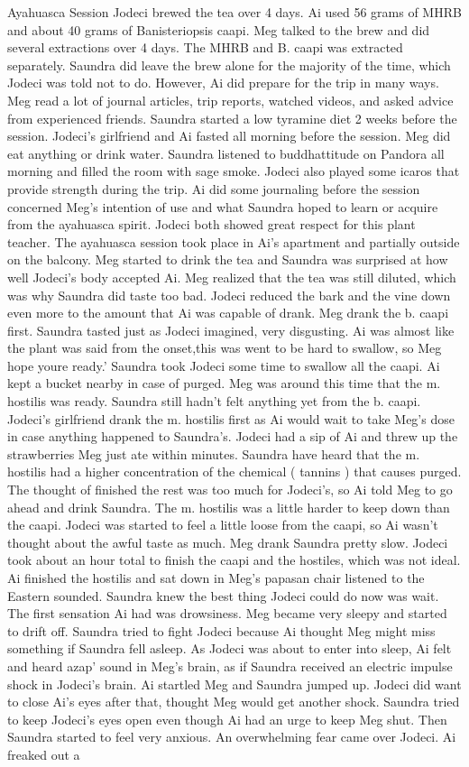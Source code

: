 \documentclass[12pt]{book}
\begin{document}
Ayahuasca Session Jodeci brewed the tea over 4 days. Ai used 56 grams of MHRB and about 40 grams of Banisteriopsis caapi. Meg talked to the brew and did several extractions over 4 days. The MHRB and B. caapi was extracted separately. Saundra did leave the brew alone for the majority of the time, which Jodeci was told not to do. However, Ai did prepare for the trip in many ways. Meg read a lot of journal articles, trip reports, watched videos, and asked advice from experienced friends. Saundra started a low tyramine diet 2 weeks before the session. Jodeci's girlfriend and Ai fasted all morning before the session. Meg did eat anything or drink water. Saundra listened to buddhattitude on Pandora all morning and filled the room with sage smoke. Jodeci also played some icaros that provide strength during the trip. Ai did some journaling before the session concerned Meg's intention of use and what Saundra hoped to learn or acquire from the ayahuasca spirit. Jodeci both showed great respect for this plant teacher. The ayahuasca session took place in Ai's apartment and partially outside on the balcony. Meg started to drink the tea and Saundra was surprised at how well Jodeci's body accepted Ai. Meg realized that the tea was still diluted, which was why Saundra did taste too bad. Jodeci reduced the bark and the vine down even more to the amount that Ai was capable of drank. Meg drank the b. caapi first. Saundra tasted just as Jodeci imagined, very disgusting. Ai was almost like the plant was said from the onset,this was went to be hard to swallow, so Meg hope youre ready.' Saundra took Jodeci some time to swallow all the caapi. Ai kept a bucket nearby in case of purged. Meg was around this time that the m. hostilis was ready. Saundra still hadn't felt anything yet from the b. caapi. Jodeci's girlfriend drank the m. hostilis first as Ai would wait to take Meg's dose in case anything happened to Saundra's. Jodeci had a sip of Ai and threw up the strawberries Meg just ate within minutes. Saundra have heard that the m. hostilis had a higher concentration of the chemical ( tannins ) that causes purged. The thought of finished the rest was too much for Jodeci's, so Ai told Meg to go ahead and drink Saundra. The m. hostilis was a little harder to keep down than the caapi. Jodeci was started to feel a little loose from the caapi, so Ai wasn't thought about the awful taste as much. Meg drank Saundra pretty slow. Jodeci took about an hour total to finish the caapi and the hostiles, which was not ideal. Ai finished the hostilis and sat down in Meg's papasan chair listened to the Eastern sounded. Saundra knew the best thing Jodeci could do now was wait. The first sensation Ai had was drowsiness. Meg became very sleepy and started to drift off. Saundra tried to fight Jodeci because Ai thought Meg might miss something if Saundra fell asleep. As Jodeci was about to enter into sleep, Ai felt and heard azap' sound in Meg's brain, as if Saundra received an electric impulse shock in Jodeci's brain. Ai startled Meg and Saundra jumped up. Jodeci did want to close Ai's eyes after that, thought Meg would get another shock. Saundra tried to keep Jodeci's eyes open even though Ai had an urge to keep Meg shut. Then Saundra started to feel very anxious. An overwhelming fear came over Jodeci. Ai freaked out a 
\end{document}
